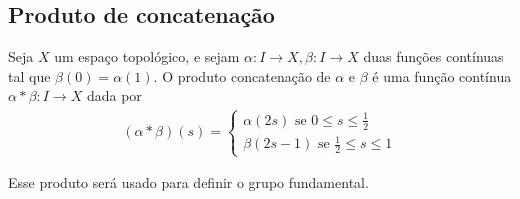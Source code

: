 \subsection{Produto de concatenação}
\label{Produto-grupo-fundamental-def}
\begin{defi}
	Seja $X$ um espaço topológico, e sejam $\alpha:I\rightarrow X, \beta:I\rightarrow X$ duas funções contínuas tal que $\beta(0)=\alpha(1).$ O produto concatenação de $\alpha$ e $\beta$ é uma função contínua $\alpha*\beta:I\rightarrow X$ dada por 
 \begin{align*}
     (\alpha*\beta)(s)=\begin{cases}
         \alpha(2s)\mbox{ se }0\le s\le\frac{1}{2}\\
         \beta(2s-1)\mbox{ se }\frac{1}{2}\le s \le 1
     \end{cases}
 \end{align*}
\end{defi}

Esse produto será usado para definir o grupo fundamental.



